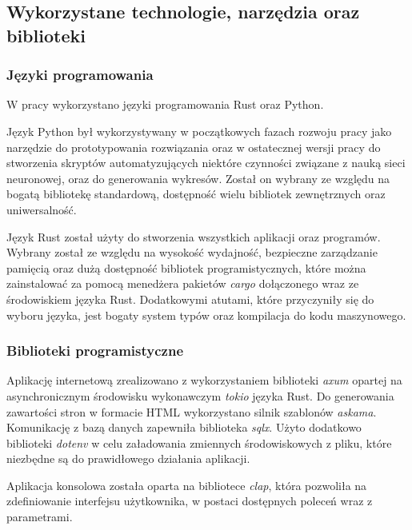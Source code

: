     \subsection{Wykorzystane technologie, narzędzia oraz biblioteki}

        \subsubsection{Języki programowania}

            W pracy wykorzystano języki programowania Rust\cite{Rust} oraz Python\cite{Python}.
            
            Język Python był wykorzystywany w początkowych fazach rozwoju pracy jako narzędzie do prototypowania rozwiązania oraz w ostatecznej wersji pracy do stworzenia skryptów automatyzujących niektóre czynności związane z nauką sieci neuronowej, oraz do generowania wykresów. Został on wybrany ze względu na bogatą bibliotekę standardową, dostępność wielu bibliotek zewnętrznych oraz uniwersalność.
            
            Język Rust został użyty do stworzenia wszystkich aplikacji oraz programów. Wybrany został ze względu na wysokość wydajność, bezpieczne zarządzanie pamięcią oraz dużą dostępność bibliotek programistycznych, które można zainstalować za pomocą menedżera pakietów \textit{cargo}\cite{Rust:cargo} dołączonego wraz ze środowiskiem języka Rust. Dodatkowymi atutami, które przyczyniły się do wyboru języka, jest bogaty system typów oraz kompilacja do kodu maszynowego. 

        \subsubsection{Biblioteki programistyczne}

            Aplikację internetową zrealizowano z wykorzystaniem biblioteki \textit{axum}\cite{Rust:axum} opartej na asynchronicznym środowisku wykonawczym \textit{tokio}\cite{Rust:tokio} języka Rust.
            Do generowania zawartości stron w formacie HTML wykorzystano silnik szablonów \textit{askama}\cite{Rust:askama}. Komunikację z bazą danych zapewniła biblioteka \textit{sqlx}\cite{Rust:sqlx}. Użyto dodatkowo biblioteki \textit{dotenv}\cite{Rust:dotenv} w celu załadowania zmiennych środowiskowych z pliku, które niezbędne są do prawidłowego działania aplikacji.

            Aplikacja konsolowa została oparta na bibliotece \textit{clap}\cite{Rust:clap}, która pozwoliła na zdefiniowanie interfejsu użytkownika, w postaci dostępnych poleceń wraz z parametrami.

